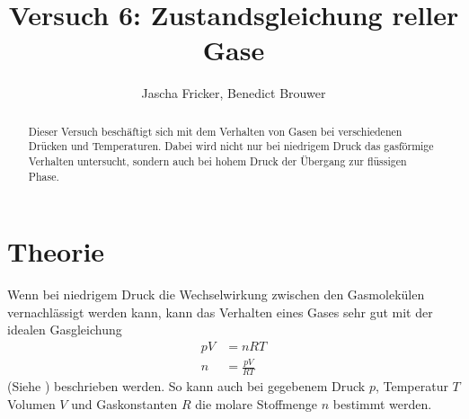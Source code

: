\documentclass[11pt, a4paper]{article}
\title{Versuch 6: Zustandsgleichung reller Gase}
\author{Jascha Fricker, Benedict Brouwer}
\begin{document}
    \maketitle

    

    \begin{abstract}
        Dieser Versuch beschäftigt sich mit dem Verhalten von Gasen bei verschiedenen Drücken und Temperaturen.
        Dabei wird nicht nur bei niedrigem Druck das gasförmige Verhalten untersucht, sondern auch bei hohem Druck
        der Übergang zur flüssigen Phase.
    \end{abstract}

    \tableofcontents

    \newpage

    \section{Theorie}
    Wenn bei niedrigem Druck die Wechselwirkung zwischen den Gasmolekülen vernachlässigt werden kann,
    kann das Verhalten eines Gases sehr gut mit der idealen Gasgleichung
    \begin{align}
        p V &= n R T \nonumber \nonumber\\
        n &= \frac{p V}{R T} \label{eq:ideal}
    \end{align}
    (Siehe \cite[(1)]{ZUS}) beschrieben werden. So kann auch bei gegebenem Druck $p$, Temperatur $T$ Volumen $V$ und
    Gaskonstanten $R$ die molare Stoffmenge $n$ bestimmt werden. \\
\end{document}
